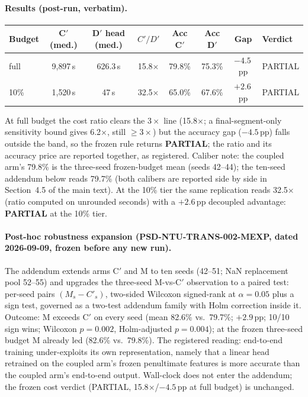 \documentclass[11pt,a4paper]{article}
\begin{document}
\paragraph{Results (post-run, verbatim).}
\begin{center}
\begin{tabular}{lccccccl}
\toprule
Budget & C$'$ (med.) & D$'$ head (med.) & $C'/D'$ & Acc C$'$ & Acc D$'$ & Gap & Verdict \\
\midrule
full & 9{,}897\,s & 626.3\,s & 15.8$\times$ & 79.8\% & 75.3\% & $-4.5$\,pp & PARTIAL \\
10\% & 1{,}520\,s & 47\,s & 32.5$\times$ & 65.0\% & 67.6\% & $+2.6$\,pp & PARTIAL \\
\bottomrule
\end{tabular}
\end{center}
At full budget the cost ratio clears the $3\times$ line (15.8$\times$; a final-segment-only sensitivity bound gives 6.2$\times$, still $\geq 3\times$) but the accuracy gap ($-4.5$\,pp) falls outside the band, so the frozen rule returns \textbf{PARTIAL}; the ratio and its accuracy price are reported together, as registered. Caliber note: the coupled arm's 79.8\% is the three-seed frozen-budget mean (seeds 42--44); the ten-seed addendum below reads 79.7\% (both calibers are reported side by side in Section~4.5 of the main text). At the 10\% tier the same replication reads 32.5$\times$ (ratio computed on unrounded seconds) with a $+2.6$\,pp decoupled advantage: \textbf{PARTIAL} at the 10\% tier.

\paragraph{Post-hoc robustness expansion (PSD-NTU-TRANS-002-MEXP, dated 2026-09-09, frozen before any new run).}
The addendum extends arms C$'$ and M to ten seeds (42--51; NaN replacement pool 52--55) and upgrades the three-seed M-vs-C$'$ observation to a paired test: per-seed pairs $(M_s - C'_s)$, two-sided Wilcoxon signed-rank at $\alpha = 0.05$ plus a sign test, governed as a two-test addendum family with Holm correction inside it. Outcome: M exceeds C$'$ on every seed (mean 82.6\% vs.\ 79.7\%; $+2.9$\,pp; 10/10 sign wins; Wilcoxon $p = 0.002$, Holm-adjusted $p = 0.004$); at the frozen three-seed budget M already led (82.6\% vs.\ 79.8\%). The registered reading: end-to-end training under-exploits its own representation, namely that a linear head retrained on the coupled arm's frozen penultimate features is more accurate than the coupled arm's end-to-end output. Wall-clock does not enter the addendum; the frozen cost verdict (PARTIAL, 15.8$\times$/$-4.5$\,pp at full budget) is unchanged.
\end{document}
